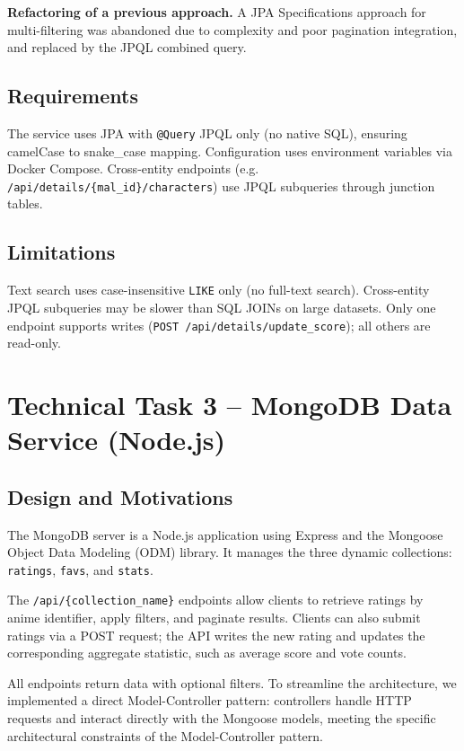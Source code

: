 \documentclass[12pt,a4paper]{article}
\begin{document}
\textbf{Refactoring of a previous approach.} A JPA Specifications approach for multi-filtering was abandoned due to complexity and poor pagination integration, and replaced by the JPQL combined query.

\subsection{Requirements}

The service uses JPA with \texttt{@Query} JPQL only (no native SQL), ensuring camelCase to snake\_case mapping. Configuration uses environment variables via Docker Compose. Cross-entity endpoints (e.g. \texttt{/api/details/\{mal\_id\}/characters}) use JPQL subqueries through junction tables.

\subsection{Limitations}

Text search uses case-insensitive \texttt{LIKE} only (no full-text search). Cross-entity JPQL subqueries may be slower than SQL JOINs on large datasets. Only one endpoint supports writes (\texttt{POST /api/details/update\_score}); all others are read-only.
\section{Technical Task 3 -- MongoDB Data Service (Node.js)}

\subsection{Design and Motivations}

The MongoDB server is a Node.js application using Express and the Mongoose Object Data Modeling (ODM) library. It manages the three dynamic collections: \texttt{ratings}, \texttt{favs}, and \texttt{stats}.

The \texttt{/api/\{collection\_name\}} endpoints allow clients to retrieve ratings by anime identifier, apply filters, and paginate results. Clients can also submit ratings via a POST request; the API writes the new rating and updates the corresponding aggregate statistic, such as average score and vote counts.

All endpoints return data with optional filters. To streamline the architecture, we implemented a direct Model-Controller pattern: controllers handle HTTP requests and interact directly with the Mongoose models, meeting the specific architectural constraints of the Model-Controller pattern.
\end{document}
